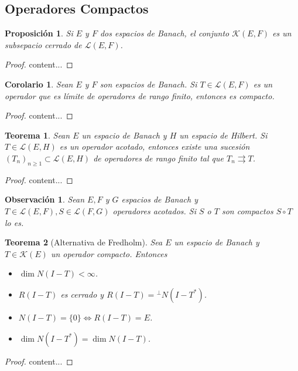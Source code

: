 \documentclass[11pt]{report}
\theoremstyle{colored}
\newtheorem{theorem}{Teorema}[section]
\newtheorem{proposition}{Proposición}[section]
\newtheorem{corollary}{Corolario}[section]
\newtheorem{remark}{Observación}[section]
\begin{document}
\subsection{Operadores Compactos}

\begin{proposition} Si $E$ y $F$ dos espacios de Banach, el conjunto $\mathscr{K}(E,F)$ es un subsepacio cerrado de $\mathscr{L}(E,F)$.
\end{proposition}
\begin{proof}
content...
\end{proof}

\begin{corollary} Sean $E$ y $F$ son espacios de Banach. Si $T \in \mathscr{L}(E,F)$ es un operador que es límite de operadores de rango finito, entonces es compacto.
\end{corollary}
\begin{proof}
content...
\end{proof}

\begin{theorem} Sean $E$ un espacio de Banach y $H$ un espacio de Hilbert. Si $T \in \mathscr{L}(E,H)$ es un operador acotado, entonces existe una sucesión $(T_n)_{n \geq 1} \subset  \mathscr{L}(E,H)$ de operadores de rango finito tal que $T_n \rightrightarrows T$.
\end{theorem}
\begin{proof}
content...
\end{proof}

\begin{remark} Sean $E,F$ y $G$ espacios de Banach y $T \in \mathscr{L}(E,F), S \in \mathscr{L}(F,G)$ operadores acotados. Si $S$ o $T$ son compactos $S \circ T$ lo es.
\end{remark}

\begin{theorem}[Alternativa de Fredholm] Sea $E$ un espacio de Banach y $T \in \mathscr{K}(E)$ un operador compacto. Entonces
\begin{itemize}
\item[(a)] $\dim N(I-T) < \infty$.
\item[(b)] $R(I-T)$ es cerrado y $R(I-T) = {}^\perp N(I-T^*)$.
\item[(c)] $N(I-T) = \{0\} \iff R(I-T) = E$.
\item[(d)] $\dim N(I-T^*) = \dim N(I-T)$.
\end{itemize} 
\end{theorem}
\begin{proof}
content...
\end{proof}
\end{document}
